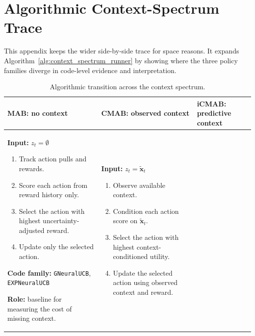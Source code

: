 \documentclass[conference]{IEEEtran}
\begin{document}
\section{Algorithmic Context-Spectrum Trace}
\label{app:algorithm_spectrum_trace}

This appendix keeps the wider side-by-side trace for space reasons. It expands
Algorithm~\ref{alg:context_spectrum_runner} by showing where the three policy
families diverge in code-level evidence and interpretation.

\begin{table}[!t]
\caption{Algorithmic transition across the context spectrum.}
\label{tab:algorithm_context_trace}
\centering
\scriptsize
\setlength{\tabcolsep}{4pt}
\begin{tabular}{p{}p{}p{}}
\toprule
\textbf{MAB: no context} &
\textbf{CMAB: observed context} &
\textbf{iCMAB: predictive context} \\
\midrule

\begin{minipage}[t]{0.30\textwidth}
\textbf{Input:} $z_t=\emptyset$

\vspace{0.3em}
\begin{enumerate}
\setlength\itemsep{0.15em}
\item Track action pulls and rewards.
\item Score each action from reward history only.
\item Select the action with highest uncertainty-adjusted reward.
\item Update only the selected action.
\end{enumerate}

\textbf{Code family:}
\texttt{GNeuralUCB}, \texttt{EXPNeuralUCB}

\vspace{0.3em}
\textbf{Role:} baseline for measuring the cost of missing context.
\end{minipage}
&
\begin{minipage}[t]{0.30\textwidth}
\textbf{Input:} $z_t=\tilde{\mathbf{x}}_t$

\vspace{0.3em}
\begin{enumerate}
\setlength\itemsep{0.15em}
\item Observe available context.
\item Condition each action score on $\tilde{\mathbf{x}}_t$.
\item Select the action with highest context-conditioned utility.
\item Update the selected action using observed context and reward.
\end{enumerate}


\end{minipage}
\end{tabular}
\end{table}
\end{document}
